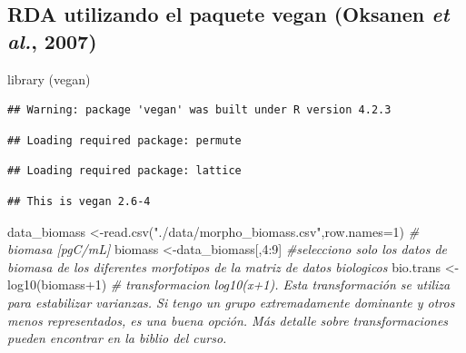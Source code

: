 \documentclass[
]{book}
\newenvironment{Shaded}{\begin{snugshade}}{\end{snugshade}}
\newcommand{\AttributeTok}[1]{\textcolor[rgb]{0.77,0.63,0.00}{#1}}
\newcommand{\CommentTok}[1]{\textcolor[rgb]{0.56,0.35,0.01}{\textit{#1}}}
\newcommand{\DecValTok}[1]{\textcolor[rgb]{0.00,0.00,0.81}{#1}}
\newcommand{\FunctionTok}[1]{\textcolor[rgb]{0.00,0.00,0.00}{#1}}
\newcommand{\NormalTok}[1]{#1}
\newcommand{\OtherTok}[1]{\textcolor[rgb]{0.56,0.35,0.01}{#1}}
\newcommand{\SpecialCharTok}[1]{\textcolor[rgb]{0.00,0.00,0.00}{#1}}
\newcommand{\StringTok}[1]{\textcolor[rgb]{0.31,0.60,0.02}{#1}}
\begin{document}
\hypertarget{rda-utilizando-el-paquete-vegan-oksanen-et-al.-2007}{%
\subsection{\texorpdfstring{RDA utilizando el paquete \textbf{vegan} (Oksanen \emph{et al.}, 2007)}{RDA utilizando el paquete vegan (Oksanen et al., 2007)}}\label{rda-utilizando-el-paquete-vegan-oksanen-et-al.-2007}}

\begin{Shaded}
\begin{Highlighting}[]
\FunctionTok{library}\NormalTok{ (vegan)}
\end{Highlighting}
\end{Shaded}

\begin{verbatim}
## Warning: package 'vegan' was built under R version 4.2.3
\end{verbatim}

\begin{verbatim}
## Loading required package: permute
\end{verbatim}

\begin{verbatim}
## Loading required package: lattice
\end{verbatim}

\begin{verbatim}
## This is vegan 2.6-4
\end{verbatim}

\begin{Shaded}
\begin{Highlighting}[]
\NormalTok{data\_biomass }\OtherTok{\textless{}{-}}\FunctionTok{read.csv}\NormalTok{(}\StringTok{"./data/morpho\_biomass.csv"}\NormalTok{,}\AttributeTok{row.names=}\DecValTok{1}\NormalTok{) }\CommentTok{\# biomasa [pgC/mL]}
\NormalTok{biomass }\OtherTok{\textless{}{-}}\NormalTok{data\_biomass[,}\DecValTok{4}\SpecialCharTok{:}\DecValTok{9}\NormalTok{] }\CommentTok{\#selecciono solo los datos de biomasa de los diferentes morfotipos de la matriz de datos biologicos}
\NormalTok{bio.trans }\OtherTok{\textless{}{-}}\FunctionTok{log10}\NormalTok{(biomass}\SpecialCharTok{+}\DecValTok{1}\NormalTok{) }\CommentTok{\# transformacion log10(x+1). Esta transformación se utiliza para estabilizar varianzas. Si tengo un grupo extremadamente dominante y otros menos representados, es una buena opción. Más detalle sobre transformaciones pueden encontrar en la biblio del curso. }
\end{Highlighting}
\end{Shaded}
\end{document}
